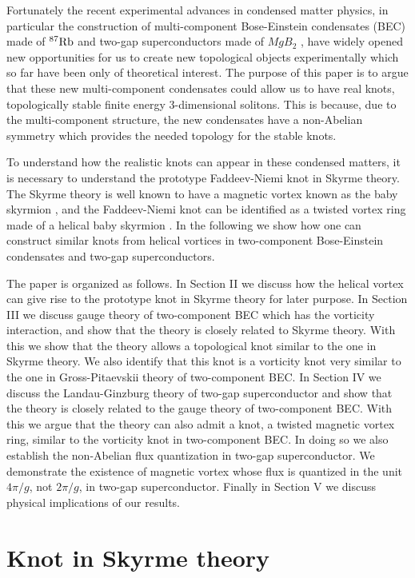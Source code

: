\documentclass[twocolumn,showpacs,showkeys]{revtex4}
\begin{document}
Fortunately the recent experimental advances in condensed matter
physics, in particular the construction of multi-component Bose-Einstein 
condensates (BEC) made of $^{87}{\rm Rb}$ \cite{bec,ruo}
and two-gap superconductors made of $MgB_2$ \cite{exp1,exp2}, 
have widely opened new opportunities for
us to create new topological objects experimentally which so far
have been only of theoretical interest. 
The purpose of this paper is to argue that these new 
multi-component condensates could allow us to have real
knots, topologically stable finite energy 3-dimensional solitons.
This is because, due to the multi-component structure, the new condensates
have a non-Abelian symmetry which provides the needed topology
for the stable knots.

To understand how the realistic knots can appear in these
condensed matters, it is necessary to understand 
the prototype Faddeev-Niemi knot in Skyrme theory. 
The Skyrme theory is well known to have a magnetic vortex 
known as the baby skyrmion \cite{piet}, and the
Faddeev-Niemi knot can be identified as a twisted vortex ring
made of a helical baby skyrmion \cite{prl01,plb04}. In the following
we show how one can construct similar knots from helical vortices 
in two-component Bose-Einstein condensates and two-gap superconductors. 

The paper is organized as follows. In Section II we discuss
how the helical vortex can give rise to the prototype knot 
in Skyrme theory for later purpose.
In Section III we discuss gauge theory of two-component BEC
which has the vorticity interaction, and show that the theory 
is closely related to Skyrme theory. With this we show that
the theory allows a topological knot similar to the one in 
Skyrme theory. We also identify that this knot is a vorticity knot 
very similar to the one in Gross-Pitaevskii theory of two-component BEC.
In Section IV we discuss the Landau-Ginzburg theory of two-gap
superconductor and show that the theory is closely related to 
the gauge theory of two-component BEC. With this we argue 
that the theory can also admit a knot, a twisted magnetic vortex 
ring, similar to the vorticity knot in two-component BEC.
In doing so we also establish the non-Abelian flux quantization
in two-gap superconductor. We demonstrate the existence of magnetic 
vortex whose flux is quantized in the unit $4\pi/g$, not $2\pi/g$, 
in two-gap superconductor.
Finally in Section V we discuss physical implications of 
our results.

\section{Knot in Skyrme theory}
\end{document}
